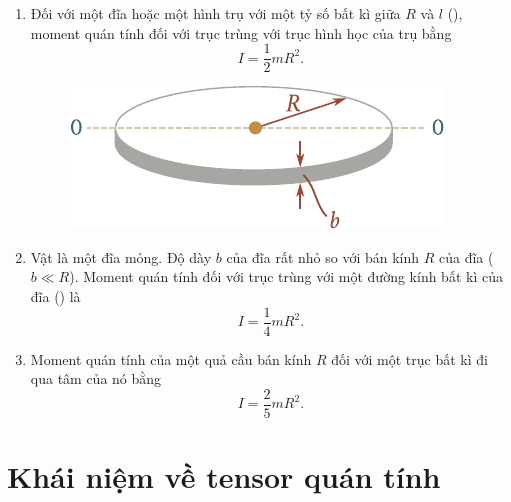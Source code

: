 \begin{enumerate}[1.]
	\item Đối với một đĩa hoặc một hình trụ với một tỷ số bất kì giữa $R$ và $l$ (), moment quán tính đối với trục trùng với trục hình học của trụ bằng  %
	\begin{equation}\label{eq:5_26}
	I = \frac{1}{2}mR^2.
	\end{equation}
	
	\begin{figure}[!htb]
	    \begin{center}
		    \includegraphics[scale=0.95]{figures/ch_05/fig_5_15.pdf}
		    \caption[]{}
		    \label{fig:5_15}
	    \end{center}
    \end{figure}

	\item Vật là một đĩa mỏng. Độ dày $b$ của đĩa rất nhỏ so với bán kính $R$ của đĩa ($b \ll R$). Moment quán tính đối với trục trùng với một đường kính bất kì của đĩa () là %
	\begin{equation}\label{eq:5_27}
		I = \frac{1}{4}mR^2.
	\end{equation}

	\item Moment quán tính của một quả cầu bán kính $R$ đối với một trục bất kì đi qua tâm của nó bằng %
	\begin{equation}\label{eq:5_28}
		I = \frac{2}{5}mR^2.
	\end{equation}
\end{enumerate}

\section{Khái niệm về tensor quán tính}\label{sec:5_5}

